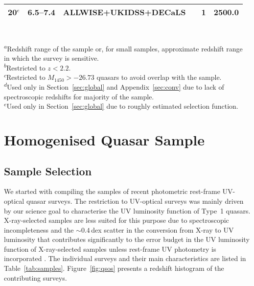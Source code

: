 \documentclass[fleqn,usenatbib]{mnras}
\begin{document}
\begin{table*}
\begin{tabular}{lcllrS}
    20$^e$ & 6.5--7.4 & ALLWISE+UKIDSS+DECaLS & \citet{2018Natur.553..473B} & 1 & 2500.0 \\
    \hline
  \end{tabular}\\
  \begin{minipage}{14.5cm}
    \textsuperscript{$a$}{Redshift range of the sample or, for small
      samples, approximate redshift range in which the survey is
      sensitive.}\\
    \textsuperscript{$b$}{Restricted to $z<2.2$.}\\
    \textsuperscript{$c$}{Restricted to $M_{1450}>-26.73$ quasars to
      avoid overlap with the \citet{2016ApJ...829...33Y} sample.}\\
    \textsuperscript{$d$}{Used only in Section~\ref{sec:global} and
      Appendix~\ref{sec:conv} due to lack of spectroscopic redshifts
      for majority of the sample.}\\
    \textsuperscript{$e$}{Used only in Section~\ref{sec:global} due to
      roughly estimated selection function.}
 \end{minipage}
\end{table*}

\section{Homogenised Quasar Sample}
\label{sec:sample}

\subsection{Sample Selection}

We started with
compiling the samples of recent photometric rest-frame UV-optical
quasar surveys. The restriction to UV-optical surveys was mainly
driven by our science goal to characterise the UV luminosity function
of Type~1 quasars. X-ray-selected samples are less suited for this
purpose due to spectroscopic incompleteness and the $\sim 0.4$\,dex
scatter in the conversion from X-ray to UV luminosity
\citep{2010A&A...512A..34L, 2015MNRAS.453.1946G, 2016ApJ...819..154L}
that contributes significantly to the error budget in the UV
luminosity function of X-ray-selected samples unless rest-frame UV
photometry is incorporated \citep{2015AA...578A..83G}.  The individual
surveys and their main characteristics are listed in
Table~\ref{tab:samples}.  Figure~\ref{fig:qsos} presents a redshift
histogram of the contributing surveys.
\end{document}
